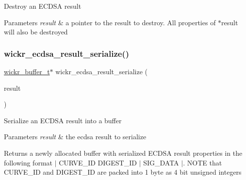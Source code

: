 Destroy an E\+C\+D\+SA result


\begin{DoxyParams}{Parameters}
{\em result} & a pointer to the result to destroy. All properties of \textquotesingle{}$\ast$result\textquotesingle{} will also be destroyed \\
\hline
\end{DoxyParams}
\mbox{\label{group__wickr__ecdsa__result_ga417d1186e93d6ae4ee4cf701a2bfb1b2}} 
\subsubsection{\texorpdfstring{wickr\+\_\+ecdsa\+\_\+result\+\_\+serialize()}{wickr\_ecdsa\_result\_serialize()}}
{\footnotesize\ttfamily \mbox{\hyperlink{structwickr__buffer}{wickr\+\_\+buffer\+\_\+t}}$\ast$ wickr\+\_\+ecdsa\+\_\+result\+\_\+serialize (\begin{DoxyParamCaption}\item[{const \mbox{\hyperlink{structwickr__ecdsa__result}{wickr\+\_\+ecdsa\+\_\+result\+\_\+t}} $\ast$}]{result }\end{DoxyParamCaption})}

Serialize an E\+C\+D\+SA result into a buffer


\begin{DoxyParams}{Parameters}
{\em result} & the ecdsa result to serialize \\
\hline
\end{DoxyParams}
\begin{DoxyReturn}{Returns}
a newly allocated buffer with serialized E\+C\+D\+SA result properties in the following format $\vert$ C\+U\+R\+V\+E\+\_\+\+ID D\+I\+G\+E\+S\+T\+\_\+\+ID $\vert$ S\+I\+G\+\_\+\+D\+A\+TA $\vert$. N\+O\+TE that C\+U\+R\+V\+E\+\_\+\+ID and D\+I\+G\+E\+S\+T\+\_\+\+ID are packed into 1 byte as 4 bit unsigned integers 
\end{DoxyReturn}
